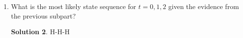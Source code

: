 \documentclass[]{book}
\theoremstyle{definition}
\newtheorem*{soln}{Solution}
\begin{document}
\begin{enumerate}
\begin{soln}
	\end{soln}
	\item What is the most likely state sequence for $t = 0,1,2$ given the evidence from the previous subpart?
	\begin{soln}
		H-H-H
	\end{soln}
\end{enumerate}
	
\end{document}
